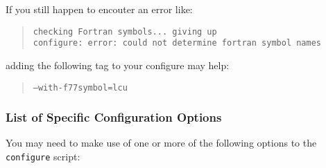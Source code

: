 \documentclass[12pt]{article}
\begin{document}
If you still happen to encouter an error like:
\begin{quotation}
\noindent
{\tt checking Fortran symbols... giving up} \\
{\tt configure: error: could not determine fortran symbol names} 
\end{quotation}
adding the following tag to your configure may help:
\begin{quotation}
{\tt --with-f77symbol=lcu}
\end{quotation}

\subsubsection{List of Specific Configuration Options}

You may need to make use of one or more of the following options to
the {\tt configure} script:
\end{document}
